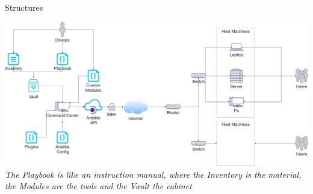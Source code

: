 \documentclass[10pt]{beamer}
\begin{document}
\begin{frame}[fragile]{Structures}

\begin{center}
\includegraphics[width=1\textwidth]{Schema.jpg}
\\
\textit{The Playbook is like an instruction manual, where the Inventory is the material, the Modules are the tools and the Vault the cabinet}
\end{center}
\end{frame}
\end{document}
